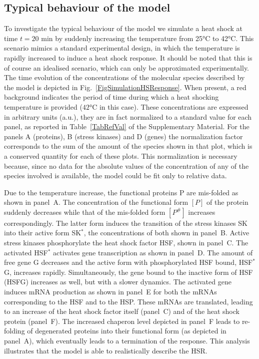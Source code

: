 \documentclass[oneside, 10pt, a4paper, twocolumn]{article}
\begin{document}
\subsection{Typical behaviour of the model}
\label{TypicalBehav}

To investigate the typical behaviour of the model we simulate a heat
shock at time $t=20$ min by suddenly increasing the temperature from 25°C to
42°C. This scenario mimics a standard experimental design, in which the temperature
is rapidly increased to induce a heat shock response. 
It should be noted that this is of course an idealised scenario, which can only be approximated experimentally.
The time evolution of the concentrations of the molecular species
described by the model is depicted in Fig.~\ref{FigSimulationHSResponse}. 
When present, a red background indicates the period of time during which a heat shocking temperature is provided ($42$°C in this case). 
These concentrations are expressed in arbitrary units (a.u.), they are in fact normalized to a standard value for each panel, as reported in Table~\ref{TabRefVal} of the Supplementary Material. For the panels A (proteins), B (stress kinases) and D (genes) the normalization factor corresponds to the sum of the amount of the species shown in that plot, which is a conserved quantity for each of these plots. 
This normalization is necessary because, since no data for the absolute values of the concentration of any of the species involved is available, the model could be fit only to relative data.

Due to the temperature increase, the
functional proteins P are mis-folded as shown in panel~A. 
The concentration of the functional form $\left[P\right]$ of the
protein suddenly decreases while that of the mis-folded form
$\left[P^\#\right]$ increases correspondingly. The latter form induces the
transition of the stress kinases SK into their active form SK$^*$, the
concentrations of both shown in panel~B. Active stress kinases
phosphorylate the heat shock factor HSF, shown in
panel~C. The activated HSF$^*$ activates gene transcription as shown in
panel~D. The amount of free gene G decreases and the active form with
phosphorylated HSF bound, HSF$^*$G, increases rapidly. Simultaneously,
the gene bound to the inactive form of HSF (HSFG) increases as well,
but with a slower dynamics. The activated gene induces mRNA production
as shown in panel~E for both the mRNAs corresponding to the HSF and to
the HSP. These mRNAs are translated, leading to an increase of the heat shock factor
itself (panel~C) and of the heat shock protein (panel~F). The
increased chaperon level depicted in panel~F leads to re-folding of
degenerated proteins into their functional form (as depicted in panel~A),
which eventually leads to a termination of the response. This analysis illustrates
that the model is able to realistically describe the HSR.
\end{document}
